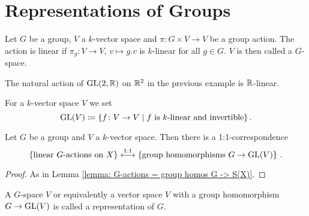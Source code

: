 \section{Representations of Groups}


\begin{definition}
  Let $G$ be a group, $V$ a $k$-vector space and $\pi \colon G \times V \to V$ be a group action.
  The action is linear if $\pi_g \colon V \to V$, $v \mapsto g.v$ is $k$-linear for all $g \in G$.
  $V$ is then called a $G$-space.
\end{definition}


\begin{example}
  The natural action of $\operatorname{GL}(2,\mathbb{R})$ on $\mathbb{R}^2$ in the previous example is $\mathbb{R}$-linear.
\end{example}


For a $k$-vector space $V$ we set
\[
            \operatorname{GL}(V)
  \coloneqq \{
              f \colon V \to V
            \mid
              f \text{ is $k$-linear and invertible}
            \} \,.
\]


\begin{lemma}
  Let $G$ be a group and $V$ a $k$-vector space.
  Then there is a 1:1-correspondence
  \[
    \left\{
      \text{linear $G$-actions on $X$}
    \right\}
    \overset{1:1}{\longleftrightarrow}
    \left\{
      \text{group homomorphisms $G \to \operatorname{GL}(V)$}
    \right\} \,.
  \]
\end{lemma}
\begin{proof}
  As in Lemma \ref{lemma: G-actions = group homos G -> S(X)}.
\end{proof}


\begin{remark}
  A $G$-space $V$ or equivalently a vector space $V$ with a group homomorphism $G \to \operatorname{GL}(V)$ is called a representation of $G$.
\end{remark}


